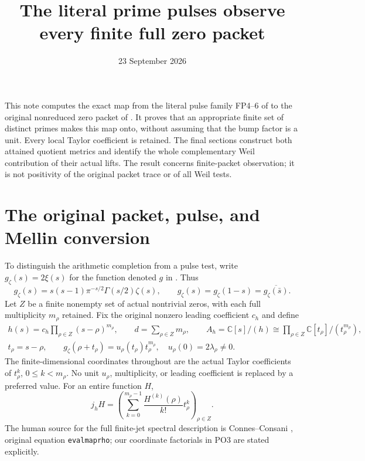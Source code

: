 \documentclass[11pt]{article}
\title{The literal prime pulses observe every finite full zero packet}
\author{}
\date{23 September 2026}
\newcommand{\C}{\mathbb C}
\begin{document}
\maketitle

This note computes the exact map from the literal pulse family
FP4--6 of \cite{FP} to the original nonreduced zero packet of
\cite{PL}. It proves that an appropriate finite set of distinct
primes makes this map onto, without assuming that the bump factor
is a unit. Every local Taylor coefficient is retained. The final
sections construct both attained quotient metrics and identify the
whole complementary Weil contribution of their actual lifts.
The result concerns finite-packet observation; it is not positivity
of the original packet trace or of all Weil tests.

\section{The original packet, pulse, and Mellin conversion}

To distinguish the arithmetic completion from a pulse test, write
\(g_\zeta(s)=2\xi(s)\) for the function denoted \(g\) in \cite{PL}.
Thus
\[
 g_\zeta(s)=s(s-1)\pi^{-s/2}\Gamma(s/2)\zeta(s),
 \qquad g_\zeta(s)=g_\zeta(1-s)
               =\overline{g_\zeta(\bar s)}.
 \tag{PO1}
\]
Let \(Z\) be a finite nonempty set of actual nontrivial zeros,
with each full multiplicity \(m_\rho\) retained. Fix the original
nonzero leading coefficient \(c_h\) and define
\[
 \begin{gathered}
 h(s)=c_h\prod_{\rho\in Z}(s-\rho)^{m_\rho},\qquad
 d=\sum_{\rho\in Z}m_\rho,\qquad
 A_h=\C[s]/(h)\cong\prod_{\rho\in Z}\C[t_\rho]/(t_\rho^{m_\rho}),\\
 t_\rho=s-\rho,\qquad
 g_\zeta(\rho+t_\rho)=u_\rho(t_\rho)t_\rho^{m_\rho},
 \quad u_\rho(0)=2\lambda_\rho\ne0 .
 \end{gathered}
 \tag{PO2}\label{po:packet}
\]
The finite-dimensional coordinates throughout are the actual
Taylor coefficients of \(t_\rho^k\), \(0\le k<m_\rho\).
No unit \(u_\rho\), multiplicity, or leading coefficient is
replaced by a preferred value. For an entire function \(H\),
\[
 j_hH=\left(\sum_{k=0}^{m_\rho-1}
                    \frac{H^{(k)}(\rho)}{k!}t_\rho^k\right)_{\rho\in Z}.
 \tag{PO3}\label{po:jet}
\]
The human source for the full finite-jet spectral description is
Connes--Consani \cite{CC}, original equation \texttt{evalmaprho};
our coordinate factorials in PO3 are stated explicitly.
\end{document}
